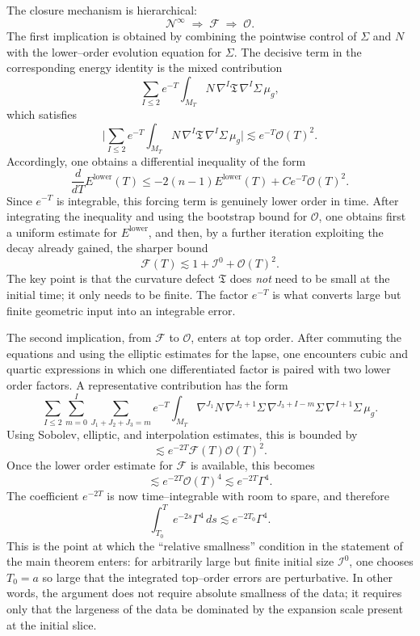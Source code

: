 \documentclass{amsart}
\begin{document}
\medskip

\noindent The closure mechanism is hierarchical:
\[
\mathcal N^\infty
\;\Longrightarrow\;
\mathcal F
\;\Longrightarrow\;
\mathcal O.
\]
The first implication is obtained by combining the pointwise control of \(\Sigma\) and \(N\) with the lower--order evolution equation for \(\Sigma\).  The decisive term in the corresponding energy identity is the mixed contribution
\[
\sum_{I\le2} e^{-T}\int_{M_T} N\,\nabla^I\mathfrak T\,\nabla^I\Sigma\,\mu_g,
\]
which satisfies
\[
\biggl|
\sum_{I\le2} e^{-T}\int_{M_T} N\,\nabla^I\mathfrak T\,\nabla^I\Sigma\,\mu_g
\biggr|
\lesssim e^{-T}\mathcal O(T)^2.
\]
Accordingly, one obtains a differential inequality of the form
\[
\frac{d}{dT}E^{\mathrm{lower}}(T)
 \le -2(n-1)E^{\mathrm{lower}}(T)
      + C e^{-T}\mathcal O(T)^2.
\]
Since \(e^{-T}\) is integrable, this forcing term is genuinely lower order in time.  After integrating the inequality and using the bootstrap bound for \(\mathcal O\), one obtains first a uniform estimate for \(E^{\mathrm{lower}}\), and then, by a further iteration exploiting the decay already gained, the sharper bound
\[
\mathcal F(T)\lesssim 1+\mathcal I^0+\mathcal O(T)^2.
\]
The key point is that the curvature defect \(\mathfrak T\) does \emph{not} need to be small at the initial time; it only needs to be finite.  The factor \(e^{-T}\) is what converts large but finite geometric input into an integrable error.

\medskip

\noindent The second implication, from \(\mathcal F\) to \(\mathcal O\), enters at top order.  After commuting the equations and using the elliptic estimates for the lapse, one encounters cubic and quartic expressions in which one differentiated factor is paired with two lower order factors.  A representative contribution has the form
\[
\sum_{I\le2}\sum_{m=0}^I\sum_{J_1+J_2+J_3=m}
e^{-T}
\int_{M_T}
\nabla^{J_1}N\,
\nabla^{J_2+1}\Sigma\,
\nabla^{J_3+I-m}\Sigma\,
\nabla^{I+1}\Sigma\,
\mu_g.
\]
Using Sobolev, elliptic, and interpolation estimates, this is bounded by
\[
\lesssim e^{-2T}\mathcal F(T)\mathcal O(T)^2.
\]
Once the lower order estimate for \(\mathcal F\) is available, this becomes
\[
\lesssim e^{-2T}\mathcal O(T)^4
\lesssim e^{-2T}\Gamma^4.
\]
The coefficient \(e^{-2T}\) is now time--integrable with room to spare, and therefore
\[
\int_{T_0}^{T} e^{-2s}\Gamma^4\,ds
\lesssim e^{-2T_0}\Gamma^4.
\]
This is the point at which the ``relative smallness'' condition in the statement of the main theorem enters: for arbitrarily large but finite initial size \(\mathcal I^0\), one chooses \(T_0=a\) so large that the integrated top--order errors are perturbative.  In other words, the argument does not require absolute smallness of the data; it requires only that the largeness of the data be dominated by the expansion scale present at the initial slice.
\end{document}
